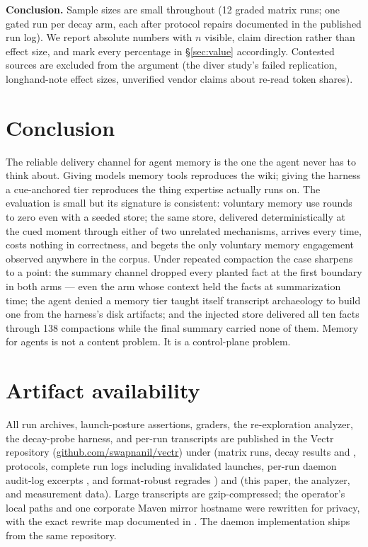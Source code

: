 \documentclass[11pt]{article}
\begin{document}
\textbf{Conclusion.} Sample sizes are small throughout (12 graded matrix
runs; one gated run per decay arm, each after protocol repairs
documented in the published run log). We report absolute numbers with
$n$ visible, claim direction rather than effect size, and mark every
percentage in \S\ref{sec:value} accordingly. Contested sources are excluded from
the argument (the diver study's failed replication, longhand-note
effect sizes, unverified vendor claims about re-read token shares).

\section{Conclusion}
\label{sec:conclusion}

The reliable delivery channel for agent memory is the one the agent
never has to think about. Giving models memory tools reproduces the
wiki; giving the harness a cue-anchored tier reproduces the thing
expertise actually runs on. The evaluation is small but its signature
is consistent: voluntary memory use rounds to zero even with a seeded
store; the same store, delivered deterministically at the cued moment
through either of two unrelated mechanisms, arrives every time,
costs nothing in correctness, and begets the only voluntary memory
engagement observed anywhere in the corpus. Under repeated compaction
the case sharpens to a point: the summary channel dropped every
planted fact at the first boundary in both arms --- even the arm whose
context held the facts at summarization time; the agent denied a memory tier
taught itself transcript archaeology to build one from the harness's
disk artifacts; and the injected store delivered all ten facts through
138 compactions while the final summary carried none of them. Memory
for agents is not a content problem. It is a control-plane problem.

\section*{Artifact availability}

All run archives, launch-posture assertions, graders, the
re-exploration analyzer, the decay-probe harness, and per-run
transcripts are published in the Vectr repository
(\url{github.com/swapnanil/vectr}) under 
(matrix runs, decay results  and
, protocols, complete run logs including
invalidated launches, per-run daemon audit-log excerpts
, and format-robust regrades
) and  (this paper, the
analyzer, and measurement data). Large transcripts are
gzip-compressed; the operator's local paths and one corporate Maven
mirror hostname were rewritten for privacy, with the exact rewrite map
documented in . The daemon implementation ships
from the same repository.
\end{document}
